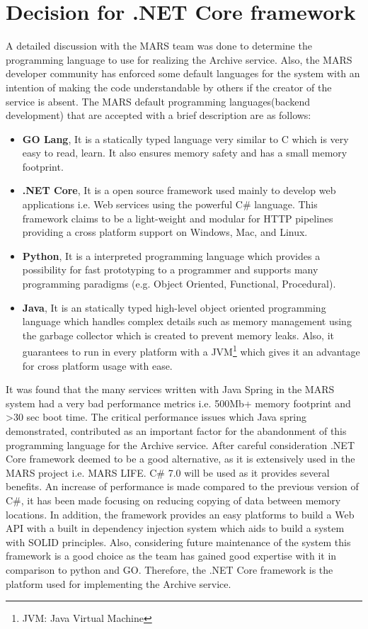 \section{Decision for .NET Core framework}
\label{sec:dotnet}
A detailed discussion with the MARS team was done to determine the programming language to use for realizing the Archive service. Also, the MARS developer community 
has enforced some default languages for the system with an intention of making the code understandable by others if the creator of the service is absent.
The MARS default programming languages(backend development) that are accepted with a brief description are as follows:
\begin{itemize}
    \item \textbf{GO Lang}, It is a statically typed language very similar to C which is very easy to read, learn. It also ensures memory safety and has
    a small memory footprint.
    \item \textbf{.NET Core}, It is a open source framework used mainly to develop web applications i.e. Web services using the powerful C\# language. This framework 
    claims to be a light-weight and modular for HTTP pipelines providing a cross platform support on Windows, Mac, and Linux.
    \item \textbf{Python}, It is a interpreted programming language which provides a possibility for fast prototyping to a programmer and supports many 
    programming paradigms (e.g. Object Oriented, Functional, Procedural).
    \item \textbf{Java}, It is an statically typed high-level object oriented programming language which handles complex details such as memory management using the
    garbage collector which is created to prevent memory leaks. Also, it guarantees to run in every platform with a JVM\footnote{JVM: Java Virtual Machine} which 
    gives it an advantage for cross platform usage with ease. 
\end{itemize}
 
It was found that the many services written with Java Spring in the MARS system had a very bad performance metrics i.e. 500Mb+ memory footprint and >30 sec boot time.
The critical performance issues which Java spring demonstrated, contributed as an important factor for the abandonment of this programming language for the Archive service. After careful 
consideration .NET Core framework deemed to be a good alternative, as it is extensively used in the MARS project i.e. MARS LIFE. C\# 7.0 will be used as it provides
several benefits. An increase of performance is made compared to the previous version of C\#, it has been made focusing on reducing copying of data between memory locations.
In addition, the framework provides an easy platforms to build a Web API with a built in dependency injection system which aids to build a system with
SOLID \cite{Hotop2015} principles. Also, considering future maintenance of the system this framework is a good choice as the team has gained good expertise with it in comparison
to python and GO. Therefore, the .NET Core framework is the platform used for implementing the Archive service.

